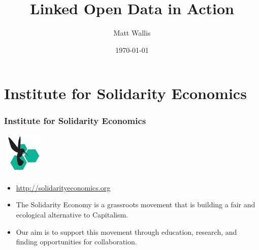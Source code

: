 
\usepackage{beamerthemesplit}
\usepackage{tikz}
\usetikzlibrary{arrows.meta,shapes,backgrounds,positioning,shapes.multipart}
\usepackage{textpos} 
\usepackage{hyperref}
\usepackage{graphicx}
\usepackage{calc}
\newlength{\popupimagewidth}

\setlength{\popupimagewidth}{\textwidth*3/5}


\title{Linked Open Data in Action}
\author{Matt Wallis}
\date{\today}




\frame{\titlepage}

\frame{\tableofcontents}

\section{Institute for Solidarity Economics}
\frame
{
  \frametitle{Institute for Solidarity Economics}
  \begin{center}
    \includegraphics[height=2cm,width=2cm]{ise-logo.jpg}
  \end{center}
  \begin{itemize}
    \item<1-> \url{http://solidarityeconomics.org}
    \item<1-> The Solidarity Economy is a grassroots movement that is building a fair and ecological alternative to Capitalism.
    \item<1-> Our aim is to support this movement through education, research, and finding opportunities for collaboration.
  \end{itemize}
}
